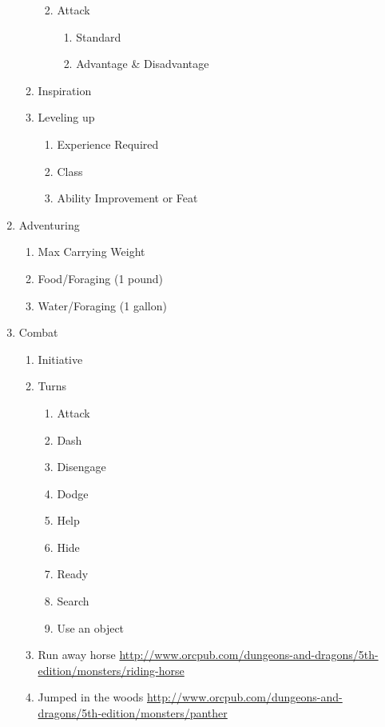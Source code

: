 \documentclass{article}
\begin{document}
\begin{enumerate}
\begin{enumerate}
\begin{enumerate}
\begin{enumerate}
              \end{enumerate}
            \item Attack
              \begin{enumerate}
                \item Standard
                \item Advantage \& Disadvantage
              \end{enumerate}
          \end{enumerate}
        \item Inspiration
        \item Leveling up
          \begin{enumerate}
            \item Experience Required
            \item Class
            \item Ability Improvement or Feat
          \end{enumerate}
      \end{enumerate}
    \item Adventuring
      \begin{enumerate}
        \item Max Carrying Weight
        \item Food/Foraging (1 pound)
        \item Water/Foraging (1 gallon)
      \end{enumerate}
    \item Combat
      \begin{enumerate}
        \item Initiative
        \item Turns
        \begin{enumerate}
          \item Attack
          \item Dash
          \item Disengage
          \item Dodge
          \item Help
          \item Hide
          \item Ready
          \item Search
          \item Use an object
        \end{enumerate}
        \item Run away horse \url{http://www.orcpub.com/dungeons-and-dragons/5th-edition/monsters/riding-horse}
        \item Jumped in the woods \url{http://www.orcpub.com/dungeons-and-dragons/5th-edition/monsters/panther}
      \end{enumerate}
  \end{enumerate}
\end{document}
